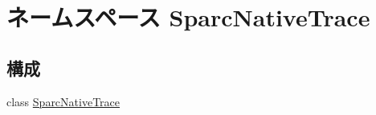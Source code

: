 \hypertarget{namespaceSparcNativeTrace}{
\section{ネームスペース SparcNativeTrace}
\label{namespaceSparcNativeTrace}
}
\subsection*{構成}
\begin{DoxyCompactItemize}
\item 
class \hyperlink{classSparcNativeTrace_1_1SparcNativeTrace}{SparcNativeTrace}
\end{DoxyCompactItemize}
